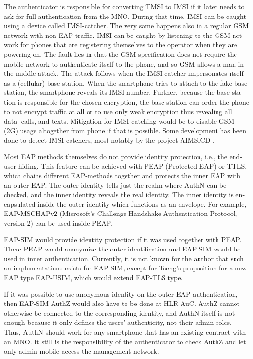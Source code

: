 \documentclass[12pt,a4paper,english]{tutthesis}
\begin{document}
\begin{otherlanguage}{english}
The authenticator is responsible for converting TMSI to IMSI if it
later needs to ask for full authentication from the MNO. During that
time, IMSI can be caught using a device called IMSI-catcher.  The
very same happens also in a regular GSM network with non-EAP traffic.
IMSI can be caught by listening to the GSM network for phones that are
registering themselves to the operator when they are powering on.  The
fault lies in that the GSM specification does not require the mobile
network to authenticate itself to the phone, and so GSM allows a 
man-in-the-middle attack.  The attack follows when the IMSI-catcher
impersonates itself as a (cellular) base station.  When the smartphone
tries to attach to the fake base station, the smartphone reveals its
IMSI number. Further, because the base station is responsible for the
chosen encryption, the base station can order the phone to not encrypt
traffic at all or to use only weak encryption thus revealing all data,
calls, and texts. Mitigation for IMSI-catching would be to disable GSM
(2G) usage altogether from phone if that is
possible\cite{imsi-heise}. Some development has been done to detect
IMSI-catchers, most notably by the project AIMSICD \cite{aimcid}.


Most EAP methods themselves do not provide identity protection, i.e., the
end-user hiding.
This feature can be achieved with PEAP (Protected EAP) or TTLS, which
chains different EAP-methods together and protects the inner EAP with
an outer EAP. 
The outer identity tells just the realm where AuthN can be checked,
and the inner identity reveals the real identity.  The inner identity is
encapsulated inside the outer identity which functions as an
envelope. 
For example, EAP-MSCHAPv2 (Microsoft's Challenge
Handshake Authentication Protocol, version 2) can be used inside PEAP.


EAP-SIM would provide identity protection if it was used together
with PEAP. There PEAP would anonymize the outer identification  and
EAP-SIM would be used in inner authentication.
Currently, it is not known for the author that such an implementations exists for
EAP-SIM,  except for Tseng's proposition \cite{tseng-usim} for a new EAP type
EAP-USIM, which would extend EAP-TLS type.

If it was possible to use anonymous identity on the outer EAP
authentication, then EAP-SIM AuthZ would also have to be done at HLR AuC.
AuthZ cannot otherwise be connected to the corresponding
identity, and AuthN itself is not enough because it only defines the users'
authenticity, not their admin roles. Thus, 
AuthN should work for any  smartphone that has an existing contract with
an MNO. 
It still is the responsibility of the authenticator to 
check AuthZ  and let only admin mobile access the management network.


\end{otherlanguage}
\end{document}
